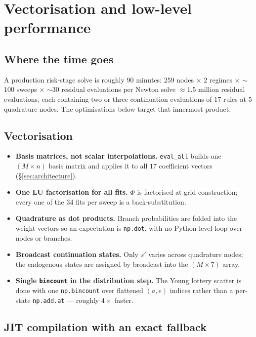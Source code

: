 \documentclass[11pt]{article}
\numberwithin{equation}{section}
\newcommand{\code}[1]{\texttt{\small #1}}
\theoremstyle{definition}
\theoremstyle{plain}
\theoremstyle{remark}
\begin{document}
\section{Vectorisation and low-level performance}
\label{sec:performance}

\subsection{Where the time goes}

A production risk-stage solve is roughly $90$ minutes: $259$ nodes $\times$ $2$
regimes $\times$ $\sim$$100$ sweeps $\times$ $\sim$$30$ residual evaluations per
Newton solve $\approx1.5$ million residual evaluations, each containing two or three
continuation evaluations of $17$ rules at $5$ quadrature nodes. The optimisations
below target that innermost product.

\subsection{Vectorisation}

\begin{itemize}
\item \textbf{Basis matrices, not scalar interpolations.} \code{eval\_all} builds one
      $(M\times n)$ basis matrix and applies it to all $17$ coefficient vectors
      (\S\ref{sec:architecture}).
\item \textbf{One LU factorisation for all fits.} $\Phi$ is factorised at grid
      construction; every one of the $34$ fits per sweep is a back-substitution.
\item \textbf{Quadrature as dot products.} Branch probabilities are folded into the
      weight vectors so an expectation is \code{np.dot}, with no Python-level loop
      over nodes or branches.
\item \textbf{Broadcast continuation states.} Only $s'$ varies across quadrature
      nodes; the endogenous states are assigned by broadcast into the $(M\times7)$
      array.
\item \textbf{Single \code{bincount} in the distribution step.} The Young lottery
      scatter is done with one \code{np.bincount} over flattened $(a,e)$ indices
      rather than a per-state \code{np.add.at} --- roughly $4\times$ faster.
\end{itemize}

\subsection{JIT compilation with an exact fallback}
\end{document}
